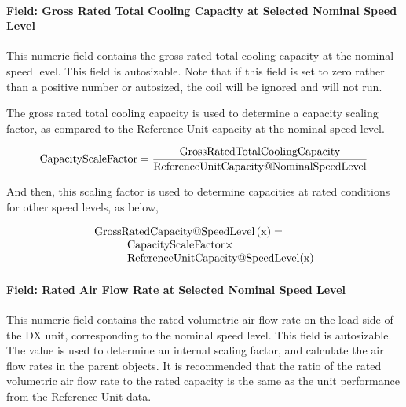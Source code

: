 \paragraph{Field: Gross Rated Total Cooling Capacity at Selected Nominal Speed Level}\label{field-gross-rated-total-cooling-capacity-at-selected-nominal-speed-level}

This numeric field contains the gross rated total cooling capacity at the nominal speed level. This field is autosizable. Note that if this field is set to zero rather than a positive number or autosized, the coil will be ignored and will not run.

The gross rated total cooling capacity is used to determine a capacity scaling factor, as compared to the Reference Unit capacity at the nominal speed level.

\begin{equation}
{\rm{CapacityScaleFactor}} = \frac{{{\rm{Gross RatedTotalCoolingCapacity}}}}{{{\rm{ReferenceUnitCapacity}}@{\rm{NominalSpeedLevel}}}}
\end{equation}

And then, this scaling factor is used to determine capacities at rated conditions for other speed levels, as below,

\begin{equation}
  \begin{array}{l}
    \rm{Gross RatedCapacity} @ \rm{SpeedLevel} \left( {\rm{x}} \right) = \\
    \quad \quad \quad \rm{CapacityScaleFactor} \times \\
    \quad \quad \quad \rm{ReferenceUnitCapacity} @ {\rm{SpeedLevel}}(\rm{x})
  \end{array}
\end{equation}

\paragraph{Field: Rated Air Flow Rate at Selected Nominal Speed Level}\label{field-rated-air-flow-rate-at-selected-nominal-speed-level}

This numeric field contains the rated volumetric air flow rate on the load side of the DX unit, corresponding to the nominal speed level. This field is autosizable. The value is used to determine an internal scaling factor, and calculate the air flow rates in the parent objects. It is recommended that the ratio of the rated volumetric air flow rate to the rated capacity is the same as the unit performance from the Reference Unit data.

